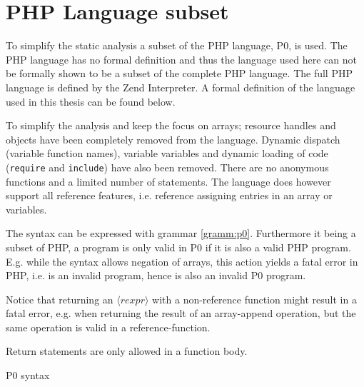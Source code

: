 \section{PHP Language subset}
\newcommand{\syn}[1]{\langle#1\rangle}
\label{sec:langsubset}
To simplify the static analysis a subset of the PHP language, P0, is used. The PHP language has no formal definition and thus the language used here can not be formally shown to be a subset of the complete PHP language. The full PHP language is defined by the Zend Interpreter. A formal definition of the language used in this thesis can be found below.

To simplify the analysis and keep the focus on arrays; resource handles and objects have been completely removed from the language. Dynamic dispatch (variable function names), variable variables and dynamic loading of code (\texttt{require} and \texttt{include}) have also been removed. There are no anonymous functions and a limited number of statements. The language does however support all reference features, i.e. reference assigning entries in an array or variables.

The syntax can be expressed with grammar \ref{gramm:p0}. Furthermore it being a subset of PHP, a program is only valid in P0  if it is also a valid PHP program. E.g. while the syntax allows negation of arrays, this action yields a fatal error in PHP, i.e. is an invalid program, hence is also an invalid P0 program. 

Notice that returning an $\syn{rexpr}$ with a non-reference function might result in a fatal error, e.g. when returning the result of an array-append operation, but the same operation is valid in a reference-function.  

Return statements are only allowed in a function body.




\begin{grammarf}
\centering

\caption{P0 syntax }
\label{gramm:p0}
\end{grammarf}